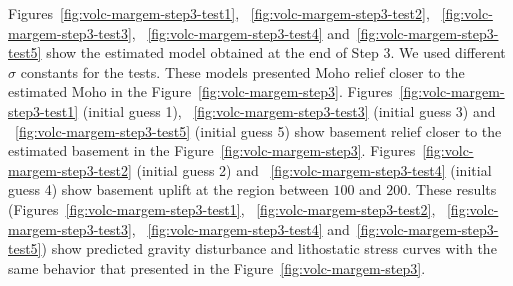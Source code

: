 \documentclass[manuscript]{geophysics}
\begin{document}
Figures~\ref{fig:volc-margem-step3-test1}, ~\ref{fig:volc-margem-step3-test2}, ~\ref{fig:volc-margem-step3-test3}, ~\ref{fig:volc-margem-step3-test4} and~\ref{fig:volc-margem-step3-test5} show the estimated model obtained at the end of Step 3. We used different $\sigma$ constants for the tests. These models presented Moho relief closer to the estimated Moho in the Figure~\ref{fig:volc-margem-step3}. Figures~\ref{fig:volc-margem-step3-test1} (initial guess 1), ~\ref{fig:volc-margem-step3-test3} (initial guess 3) and ~\ref{fig:volc-margem-step3-test5} (initial guess 5) show basement relief closer to the estimated basement in the Figure~\ref{fig:volc-margem-step3}. Figures~\ref{fig:volc-margem-step3-test2} (initial guess 2) and ~\ref{fig:volc-margem-step3-test4} (initial guess 4) show basement uplift at the region between $100$ and $200$. These results (Figures~\ref{fig:volc-margem-step3-test1}, ~\ref{fig:volc-margem-step3-test2}, ~\ref{fig:volc-margem-step3-test3}, ~\ref{fig:volc-margem-step3-test4} and~\ref{fig:volc-margem-step3-test5}) show predicted gravity disturbance and lithostatic stress curves with the same behavior that presented in the Figure~\ref{fig:volc-margem-step3}. 



\end{document}
